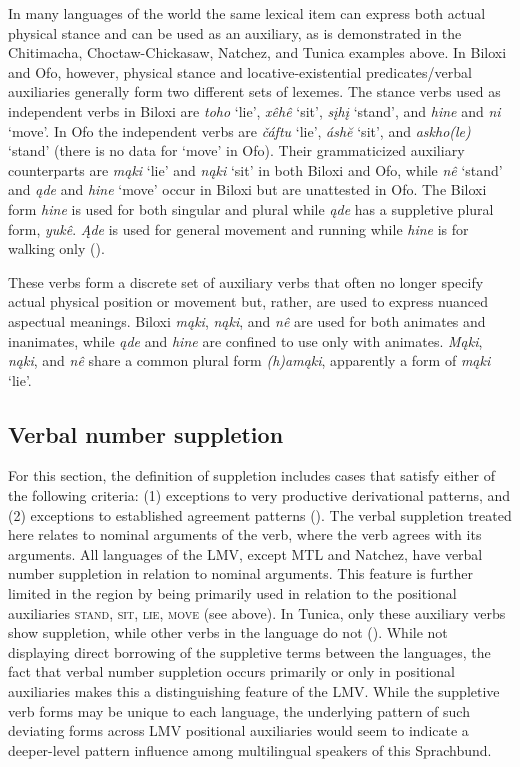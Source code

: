 \documentclass[output=paper]{LSP/langsci}
\begin{document}
In many languages of the world the same lexical item can express both actual physical stance and can be used as an auxiliary, as is demonstrated in the Chitimacha, Choctaw-Chickasaw, Natchez, and Tunica examples above. In Biloxi and Ofo, however, physical stance and locative-existential predicates/verbal auxiliaries generally form two different sets of lexemes. The stance verbs used as independent verbs in Biloxi are \emph{toho} `lie', \emph{xêhê} `sit', \emph{sįhį} `stand', and \emph{hine} and \emph{ni} `move'. In Ofo the independent verbs are \emph{čáftu} `lie', \emph{áshĕ} `sit', and \emph{askho(le)} `stand' (there is no data for `move' in Ofo). Their grammaticized auxiliary counterparts are \emph{mąki} `lie' and \emph{nąki} `sit' in both Biloxi and Ofo, while \emph{nê} `stand' and \emph{ąde} and \emph{hine} `move' occur in Biloxi but are unattested in Ofo. The Biloxi form \emph{hine} is used for both singular and plural while \emph{ąde} has a suppletive plural form, \emph{yukê}. \emph{Ąde} is used for general movement and running while \emph{hine} is for walking only (\citealt[3]{Kaufman2013}). 

These verbs form a discrete set of auxiliary verbs that often no longer specify actual physical position or movement but, rather, are used to express nuanced aspectual meanings. Biloxi \emph{mąki}, \emph{nąki}, and \emph{nê} are used for both animates and inanimates, while \emph{ąde} and \emph{hine} are confined to use only with animates. \emph{Mąki}, \emph{nąki}, and \emph{nê} share a common plural form \emph{(h)amąki}, apparently a form of \emph{mąki} `lie'. 
 
\subsection{Verbal number suppletion}

	For this section, the definition of suppletion includes cases that satisfy either of the following criteria: (1) exceptions to very productive derivational patterns, and (2) exceptions to established agreement patterns (\citealt[3]{Veselinova2003}). The verbal suppletion treated here relates to nominal arguments of the verb, where the verb agrees with its arguments. All languages of the LMV, except MTL and Natchez, have verbal number suppletion in relation to nominal arguments. This feature is further limited in the region by being primarily used in relation to the positional auxiliaries \textsc{stand}, \textsc{sit}, \textsc{lie}, \textsc{move} (see above). In Tunica, only these auxiliary verbs show suppletion, while other verbs in the language do not (\citealt[40]{Haas1946}). While not displaying direct borrowing of the suppletive terms between the languages, the fact that verbal number suppletion occurs primarily or only in positional auxiliaries makes this a distinguishing feature of the LMV. While the suppletive verb forms may be unique to each language, the underlying pattern of such deviating forms across LMV positional auxiliaries would seem to indicate a deeper-level pattern influence among multilingual speakers of this Sprachbund.
\end{document}

